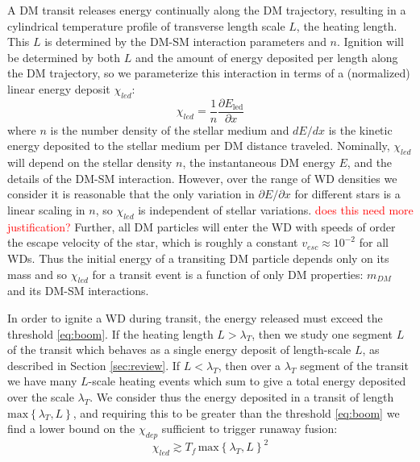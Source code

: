 \documentclass[twocolumn,showpacs,preprintnumbers,amsmath,amssymb,prd]{revtex4}
\begin{document}
A DM transit releases energy continually along the DM trajectory, resulting in a cylindrical temperature profile of transverse length scale $L$, the heating length.  This $L$ is determined by the DM-SM interaction parameters and $n$.  Ignition will be determined by both $L$ and the amount of energy deposited per length along the DM trajectory, so we parameterize this interaction in terms of a (normalized) linear energy deposit $\chi_{led}$:
\[
    \chi_{led} =
    \frac{1}{n} \frac{\partial{E_{\text{led}}}}{\partial{x}}
\]
where $n$ is the number density of the stellar medium and $d{E}/d{x}$ is the kinetic energy deposited to the stellar medium per DM distance traveled.  Nominally, $\chi_{led}$ will depend on the stellar density $n$, the instantaneous DM energy $E$, and the details of the DM-SM interaction.  However, over the range of WD densities we consider it is reasonable that the only variation in $\partial E /\partial x$ for different stars is a linear scaling in $n$, so $\chi_{led}$ is independent of stellar variations.  \textcolor{red}{does this need more justification?} Further, all DM particles will enter the WD with speeds of order the escape velocity of the star, which is roughly a constant $v_{esc} \approx 10^{-2}$ for all WDs.  Thus the initial energy of a transiting DM particle depends only on its mass and so $\chi_{led}$ for a transit event is a function of only DM properties: $m_{DM}$ and its DM-SM interactions.

In order to ignite a WD during transit, the energy released must exceed the threshold \eqref{eq:boom}.  If the heating length $L > \lambda_T$, then we study one segment $L$ of the transit which behaves as a single energy deposit of length-scale $L$, as described in Section \ref{sec:review}. If $L < \lambda_T$, then over a $\lambda_T$ segment of the transit we have many $L$-scale heating events which sum to give a total energy deposited over the scale $\lambda_T$.  We consider thus the energy deposited in a transit of length $\text{max} \left\{ \lambda_T, L \right\}$, and requiring this to be greater than the threshold \eqref{eq:boom} we find a lower bound on the $\chi_{dep}$ sufficient to trigger runaway fusion:
\begin{equation}
\label{eq:transitexplosion}
  \chi_{led} \gtrsim T_f\, \text{max}\left\{ \lambda_T, L \right\}^2
\end{equation}
\end{document}
